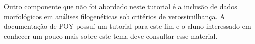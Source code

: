 \begin{refsection}
Outro componente que não foi abordado neste tutorial é a inclusão de dados morfológicos em análises filogenéticas sob critérios de verossimilhança. A documentação de POY possuí um tutorial para este fim e o aluno interessado em conhecer um pouco mais sobre este tema deve consultar esse material.

%
%

\end{refsection}
